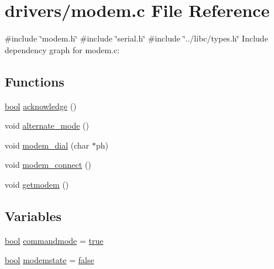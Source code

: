 \hypertarget{a00044}{}\section{drivers/modem.c File Reference}
\label{a00044}
{\ttfamily \#include \char`\"{}modem.\+h\char`\"{}}\newline
{\ttfamily \#include \char`\"{}serial.\+h\char`\"{}}\newline
{\ttfamily \#include \char`\"{}../libc/types.\+h\char`\"{}}\newline
Include dependency graph for modem.\+c\+:
\subsection*{Functions}
\begin{DoxyCompactItemize}
\item 
\hyperlink{a00140_af6a258d8f3ee5206d682d799316314b1_af6a258d8f3ee5206d682d799316314b1}{bool} \hyperlink{a00044_a8529dba543149138317e327931bf5a5c_a8529dba543149138317e327931bf5a5c}{acknowledge} ()
\item 
void \hyperlink{a00044_ace378eaa88c0b7f0cdafe97d064e36fb_ace378eaa88c0b7f0cdafe97d064e36fb}{alternate\+\_\+mode} ()
\item 
void \hyperlink{a00044_ab1123a026be8f7d0ece72e2813222da0_ab1123a026be8f7d0ece72e2813222da0}{modem\+\_\+dial} (char $\ast$ph)
\item 
void \hyperlink{a00044_a283a7e4b715971478687b2d7547780cb_a283a7e4b715971478687b2d7547780cb}{modem\+\_\+connect} ()
\item 
void \hyperlink{a00044_a5e56e19ccc8f36690d515dd09948db10_a5e56e19ccc8f36690d515dd09948db10}{getmodem} ()
\end{DoxyCompactItemize}
\subsection*{Variables}
\begin{DoxyCompactItemize}
\item 
\hyperlink{a00140_af6a258d8f3ee5206d682d799316314b1_af6a258d8f3ee5206d682d799316314b1}{bool} \hyperlink{a00044_aaf612f2f6c2c9931ab63296b3514a037_aaf612f2f6c2c9931ab63296b3514a037}{commandmode} = \hyperlink{a00140_af6a258d8f3ee5206d682d799316314b1_af6a258d8f3ee5206d682d799316314b1a08f175a5505a10b9ed657defeb050e4b}{true}
\item 
\hyperlink{a00140_af6a258d8f3ee5206d682d799316314b1_af6a258d8f3ee5206d682d799316314b1}{bool} \hyperlink{a00044_a0105e5654e7f0fa503f2853c88a2f782_a0105e5654e7f0fa503f2853c88a2f782}{modemstate} = \hyperlink{a00140_af6a258d8f3ee5206d682d799316314b1_af6a258d8f3ee5206d682d799316314b1ae9de385ef6fe9bf3360d1038396b884c}{false}
\end{DoxyCompactItemize}


